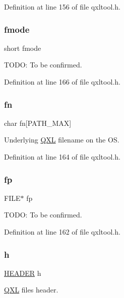 Definition at line 156 of file qxltool.\+h.

\mbox{\label{struct_q_x_l_a1e2da7ce56bf4f62a21da3ea15b88805}} 
\subsubsection{\texorpdfstring{fmode}{fmode}}
{\footnotesize\ttfamily short fmode}

T\+O\+DO\+: To be confirmed. 

Definition at line 166 of file qxltool.\+h.

\mbox{\label{struct_q_x_l_a7b855d6690caa0e60d0320cafd38051d}} 
\subsubsection{\texorpdfstring{fn}{fn}}
{\footnotesize\ttfamily char fn\mbox{[}P\+A\+T\+H\+\_\+\+M\+AX\mbox{]}}

Underlying \hyperlink{struct_q_x_l}{Q\+XL} filename on the OS. 

Definition at line 164 of file qxltool.\+h.

\mbox{\label{struct_q_x_l_aa065f30aa9f5f9a42132c82c787ee70b}} 
\subsubsection{\texorpdfstring{fp}{fp}}
{\footnotesize\ttfamily F\+I\+LE$\ast$ fp}

T\+O\+DO\+: To be confirmed. 

Definition at line 162 of file qxltool.\+h.

\mbox{\label{struct_q_x_l_a7599cc5310e4c5370ac2ff59a892244d}} 
\subsubsection{\texorpdfstring{h}{h}}
{\footnotesize\ttfamily \hyperlink{struct_h_e_a_d_e_r}{H\+E\+A\+D\+ER} h}

\hyperlink{struct_q_x_l}{Q\+XL} file\textquotesingle{}s header. 

